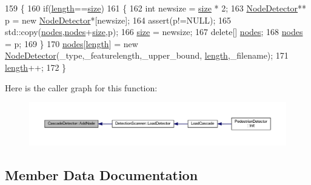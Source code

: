 \begin{DoxyCode}
159 \{
160     \textcolor{keywordflow}{if}(\mbox{\hyperlink{class_cascade_detector_a2ce4d234703b3332cf7e17624b3b30a5}{length}}==\mbox{\hyperlink{class_cascade_detector_a4a1280062076bdea7b404e9fca3a53a4}{size}})
161     \{
162         \textcolor{keywordtype}{int} newsize = \mbox{\hyperlink{class_cascade_detector_a4a1280062076bdea7b404e9fca3a53a4}{size}} * 2;
163         \mbox{\hyperlink{class_node_detector}{NodeDetector}}** p = \textcolor{keyword}{new} \mbox{\hyperlink{class_node_detector}{NodeDetector}}*[newsize];
164         assert(p!=NULL);
165         std::copy(\mbox{\hyperlink{class_cascade_detector_a7977422f255cf4d753665c0c6a0b0f07}{nodes}},\mbox{\hyperlink{class_cascade_detector_a7977422f255cf4d753665c0c6a0b0f07}{nodes}}+\mbox{\hyperlink{class_cascade_detector_a4a1280062076bdea7b404e9fca3a53a4}{size}},p);
166         \mbox{\hyperlink{class_cascade_detector_a4a1280062076bdea7b404e9fca3a53a4}{size}} = newsize;
167         \textcolor{keyword}{delete}[] \mbox{\hyperlink{class_cascade_detector_a7977422f255cf4d753665c0c6a0b0f07}{nodes}};
168         \mbox{\hyperlink{class_cascade_detector_a7977422f255cf4d753665c0c6a0b0f07}{nodes}} = p;
169     \}
170     \mbox{\hyperlink{class_cascade_detector_a7977422f255cf4d753665c0c6a0b0f07}{nodes}}[\mbox{\hyperlink{class_cascade_detector_a2ce4d234703b3332cf7e17624b3b30a5}{length}}] = \textcolor{keyword}{new} \mbox{\hyperlink{class_node_detector}{NodeDetector}}(\_type,\_featurelength,\_upper\_bound,
      \mbox{\hyperlink{class_cascade_detector_a2ce4d234703b3332cf7e17624b3b30a5}{length}},\_filename);
171     \mbox{\hyperlink{class_cascade_detector_a2ce4d234703b3332cf7e17624b3b30a5}{length}}++;
172 \}
\end{DoxyCode}
Here is the caller graph for this function\+:\nopagebreak
\begin{figure}[H]
\begin{center}
\leavevmode
\includegraphics[width=350pt]{class_cascade_detector_aa8759d8bdb90d648046aa72f0cf0fab3_icgraph}
\end{center}
\end{figure}


\subsection{Member Data Documentation}
\mbox{\label{class_cascade_detector_a2ce4d234703b3332cf7e17624b3b30a5}} 
